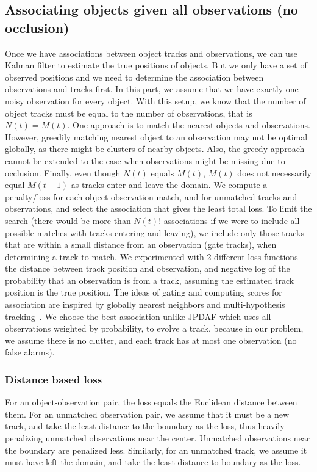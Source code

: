 \documentclass[a4paper]{article}
\begin{document}
\subsection{Associating objects given all observations (no occlusion)}

Once we have associations between object tracks and observations, we can use Kalman
filter to estimate the true positions of objects.
But we only have a set of observed positions and we need to determine the association
between observations and tracks first.
In this part, we assume that we have exactly one noisy observation for every object.
With this setup, we know that the number of object tracks must be equal to the number
of observations, that is $N(t) = M(t)$.
One approach is to match the nearest objects and observations.
However, greedily matching nearest object to an observation may not be optimal globally,
as there might be clusters of nearby objects.
Also, the greedy approach cannot be extended to the case when observations might be
missing due to occlusion.
Finally, even though $N(t)$ equals $M(t)$, $M(t)$ does not necessarily equal $M(t-1)$
as tracks enter and leave the domain.
We compute a penalty/loss for each object-observation match, and for unmatched tracks
and observations, and select the association that gives the least total loss.
To limit the search
(there would be more than $N(t)!$ associations if we were to include all possible
matches with tracks entering and leaving),
we include only those tracks that are within a small distance from an observation
(gate tracks), when determining a track to match.
We experimented with 2 different loss functions --
the distance between track position and observation, and
negative log of the probability that an observation is from a track,
assuming the estimated track position is the true position.
The ideas of gating and computing scores for association are inspired by
globally nearest neighbors and multi-hypothesis tracking~\cite{mht}.
We choose the best association unlike JPDAF which uses all observations weighted by
probability, to evolve a track, because in our problem, we assume there
is no clutter, and each track has at most one observation (no false alarms).

\subsubsection{Distance based loss}
For an object-observation pair, the loss equals the Euclidean distance between them.
For an unmatched observation pair, we assume that it must be a new track, and take
the least distance to the boundary as the loss, thus heavily penalizing unmatched
observations near the center. Unmatched observations near the boundary are penalized
less. Similarly, for an unmatched track, we assume it must have left the domain,
and take the least distance to boundary as the loss.
\end{document}
